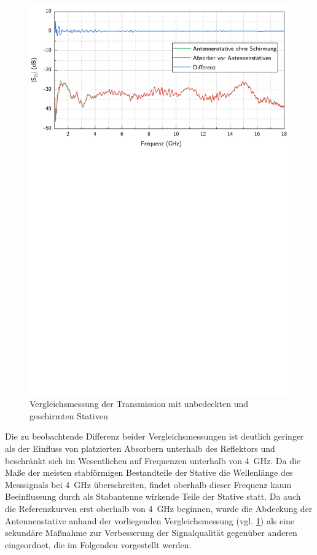 \begin{figure}[ht]
    \centering
    \includegraphics[page=1, width=.99\textwidth, trim = 0cm 15.6cm 0cm 0cm]{Abbildungen/Kapitel4/Messergebnisse/Vergleich Absorber vor Antennenstativen.pdf}
    \caption{Vergleichsmessung der Transmission mit unbedeckten und geschirmten Stativen}
    \label{fig:4_Vergleich_Absorber_vor_Stativen}
\end{figure}


Die zu beobachtende Differenz beider Vergleichsmessungen ist deutlich geringer als der Einfluss von platzierten Absorbern unterhalb des Reflektors und beschränkt sich im Wesentlichen auf Frequenzen unterhalb von \SI{4}{\giga\hertz}. Da die Maße der meisten stabförmigen Bestandteile der Stative die Wellenlänge des Messsignals bei \SI{4}{\giga\hertz} überschreiten, findet oberhalb dieser Frequenz kaum Beeinflussung durch als Stabantenne wirkende Teile der Stative statt. Da auch die Referenzkurven erst oberhalb von \SI{4}{\giga\hertz} beginnen, wurde die Abdeckung der Antennenstative anhand der vorliegenden Vergleichsmessung (vgl. \Abb\ref{fig:4_Vergleich_Absorber_vor_Stativen}) als eine sekundäre Maßnahme zur Verbesserung der Signalqualität gegenüber anderen eingeordnet, die im Folgenden vorgestellt werden.


